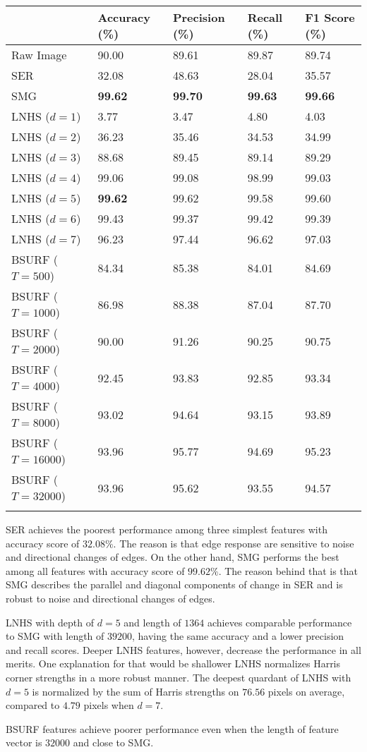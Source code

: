 \begin{longtable}[]{@{}lllll@{}}
\toprule
& Accuracy (\%) & Precision (\%) & Recall (\%) & F1 Score
(\%)\tabularnewline
\midrule
\endhead
Raw Image & 90.00 & 89.61 & 89.87 & 89.74\tabularnewline
SER & 32.08 & 48.63 & 28.04 & 35.57\tabularnewline
SMG & \textbf{99.62} & \textbf{99.70} & \textbf{99.63} &
\textbf{99.66}\tabularnewline
LNHS (\(d = 1\)) & 3.77 & 3.47 & 4.80 & 4.03\tabularnewline
LNHS (\(d = 2\)) & 36.23 & 35.46 & 34.53 & 34.99\tabularnewline
LNHS (\(d = 3\)) & 88.68 & 89.45 & 89.14 & 89.29\tabularnewline
LNHS (\(d = 4\)) & 99.06 & 99.08 & 98.99 & 99.03\tabularnewline
LNHS (\(d = 5\)) & \textbf{99.62} & 99.62 & 99.58 & 99.60\tabularnewline
LNHS (\(d = 6\)) & 99.43 & 99.37 & 99.42 & 99.39\tabularnewline
LNHS (\(d = 7\)) & 96.23 & 97.44 & 96.62 & 97.03\tabularnewline
BSURF (\(T = 500\)) & 84.34 & 85.38 & 84.01 & 84.69\tabularnewline
BSURF (\(T = 1000\)) & 86.98 & 88.38 & 87.04 & 87.70\tabularnewline
BSURF (\(T = 2000\)) & 90.00 & 91.26 & 90.25 & 90.75\tabularnewline
BSURF (\(T = 4000\)) & 92.45 & 93.83 & 92.85 & 93.34\tabularnewline
BSURF (\(T = 8000\)) & 93.02 & 94.64 & 93.15 & 93.89\tabularnewline
BSURF (\(T = 16000\)) & 93.96 & 95.77 & 94.69 & 95.23\tabularnewline
BSURF (\(T = 32000\)) & 93.96 & 95.62 & 93.55 & 94.57\tabularnewline
\bottomrule
\label{tab:features}
\end{longtable}

SER achieves the poorest performance among three simplest features with accuracy score of $32.08\%$. The reason is that edge response are sensitive to noise and directional changes of edges.
On the other hand, SMG performs the best among all features with accuracy score of $99.62\%$.
The reason behind that is that SMG describes the parallel and diagonal components of change in SER and is robust to noise and directional changes of edges.

LNHS with depth of $d = 5$ and length of $1364$ achieves comparable performance to SMG with length of $39200$, having the same accuracy and a lower precision and recall scores.
Deeper LNHS features, however, decrease the performance in all merits.
One explanation for that would be shallower LNHS normalizes Harris corner strengths in a more robust manner.
The deepest quardant of LNHS with $d = 5$ is normalized by the sum of Harris strengths on $76.56$ pixels on average, compared to $4.79$ pixels when $d = 7$.

BSURF features achieve poorer performance even when the length of feature vector is $32000$ and close to SMG.

